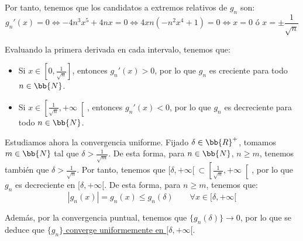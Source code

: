 \begin{ejercicio}
    Por tanto, tenemos que los candidatos a extremos relativos de $g_n$ son:
    \begin{equation*}
        g_n'(x) = 0 \iff -4n^3x^5+4nx = 0 \iff 4xn(-n^2x^4+1) = 0 \iff x = 0 \text{ ó } x =\pm \frac{1}{\sqrt{n}}
    \end{equation*}

    Evaluando la primera derivada en cada intervalo, tenemos que:
    \begin{itemize}
        \item Si $x\in \left[0,\frac{1}{\sqrt{n}}\right]$, entonces $g_n'(x) > 0$, por lo que $g_n$ es creciente para todo $n\in \bb{N}$.
        \item Si $x\in \left[\frac{1}{\sqrt{n}},+\infty\right[$, entonces $g_n'(x) < 0$, por lo que $g_n$ es decreciente para todo $n\in \bb{N}$.
    \end{itemize}
    
    Estudiamos ahora la convergencia uniforme. Fijado $\delta \in \bb{R}^+$,
    tomamos $m\in \bb{N}$ tal que $\delta > \frac{1}{\sqrt{m}}$. De esta forma,
    para $n\in \bb{N}$, $n\geq m$, tenemos también que $\delta > \frac{1}{\sqrt{n}}$. Por tanto,
    tenemos que $[\delta ,+\infty[~\subset \left[\frac{1}{\sqrt{n}},+\infty\right[$,
    por lo que $g_n$ es decreciente en $[\delta,+\infty[$. De esta forma, para $n\geq m$, tenemos que:
    \begin{equation*}
        |g_n(x)| = g_n(x) \leq g_n(\delta) \qquad \forall x\in [\delta,+\infty[
    \end{equation*}

    Además, por la convergencia puntual, tenemos que $\{g_n(\delta)\}\to 0$, por lo que se deduce que \ul{$\{g_n\}$ converge uniformemente en $[\delta,+\infty[$}.
\end{ejercicio}


